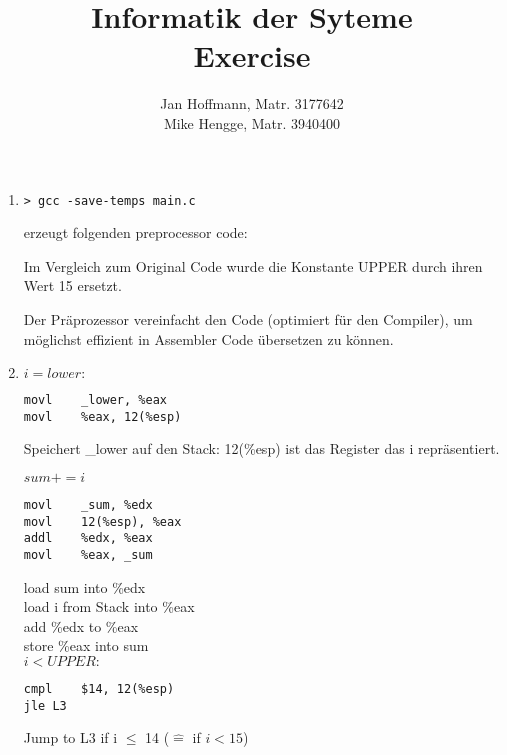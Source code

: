 \documentclass[10pt,a4paper]{article}
\title{Informatik der Syteme \\ Exercise \exnum}
\author{Jan Hoffmann, Matr. 3177642 \\ Mike Hengge,  Matr. 3940400}
\begin{document}
\section{}
	\begin{enumerate}
		\item 		
			\begin{lstlisting}[style=DOS] 
> gcc -save-temps main.c
			\end{lstlisting}
			erzeugt folgenden preprocessor code:
			
		
			Im Vergleich zum Original Code wurde die Konstante UPPER durch ihren Wert 15 ersetzt.
		
			Der Präprozessor vereinfacht den Code (optimiert für den Compiler), um möglichst effizient in Assembler Code übersetzen zu können.
			
		\item 
			$i = lower:$ \\
			\begin{lstlisting}[style=Assembler]
movl	_lower, %eax
movl	%eax, 12(%esp)
			\end{lstlisting}
			Speichert \_lower auf den Stack: 12(\%esp) ist das Register das i repräsentiert.
			
			$sum += i$ \\
			\begin{lstlisting}[style=Assembler]
movl	_sum, %edx
movl	12(%esp), %eax
addl	%edx, %eax
movl	%eax, _sum
			\end{lstlisting}
			load sum into \%edx\\
			load i from Stack into \%eax\\
			add \%edx to \%eax \\
			store \%eax into sum \\
			
			$i < UPPER:$\\
			\begin{lstlisting}[style=Assembler]
cmpl	$14, 12(%esp)
jle	L3			
			\end{lstlisting}
			Jump to L3 if i $\leq$ 14 ($\widehat{=}$ if $i < 15$)
	\end{enumerate}
\section{}
	
\end{document}
